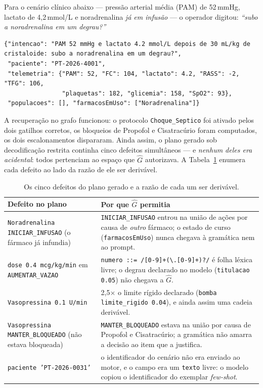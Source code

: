 \documentclass[11pt,a4paper]{article}
\begin{document}
Para o cenário clínico abaixo --- pressão arterial média (PAM) de 52\,mmHg,
lactato de 4{,}2\,mmol/L e noradrenalina \emph{já em infusão} --- o operador
digitou: \emph{``subo a noradrenalina em um degrau?''}

\begin{lstlisting}[language=tsx,caption={Cenário de entrada (\texttt{cenarios-200-med.jsonl}, linha 1).}]
{"intencao": "PAM 52 mmHg e lactato 4.2 mmol/L depois de 30 mL/kg de cristaloide: subo a noradrenalina em um degrau?",
 "paciente": "PT-2026-4001",
 "telemetria": {"PAM": 52, "FC": 104, "lactato": 4.2, "RASS": -2, "TFG": 106,
                "plaquetas": 182, "glicemia": 158, "SpO2": 93},
 "populacoes": [], "farmacosEmUso": ["Noradrenalina"]}
\end{lstlisting}

A recuperação no grafo funcionou: o protocolo \texttt{Choque\_Septico} foi
ativado pelos dois gatilhos corretos, os bloqueios de Propofol e Cisatracúrio
foram computados, os dois escalonamentos dispararam. Ainda assim, o plano gerado
sob decodificação restrita continha cinco defeitos simultâneos --- e
\emph{nenhum deles era acidental}: todos pertenciam ao espaço que
$\hat{G}$ autorizava. A Tabela~\ref{tab:defeitos} enumera cada defeito ao lado
da razão de ele ser derivável.

\begin{table}[h]
\centering
\small
\caption{Os cinco defeitos do plano gerado e a razão de cada um ser derivável.}
\label{tab:defeitos}
\begin{tabular}{@{}p{6.1cm}p{8.4cm}@{}}
\toprule
\textbf{Defeito no plano} & \textbf{Por que $\hat{G}$ permitia} \\
\midrule
\texttt{Noradrenalina INICIAR\_INFUSAO} (o fármaco já infundia) &
\texttt{INICIAR\_INFUSAO} entrou na união de ações por causa de \emph{outro}
fármaco; o estado de curso (\texttt{farmacosEmUso}) nunca chegava à gramática
nem ao prompt. \\
\addlinespace
\texttt{dose 0.4 mcg/kg/min} em \texttt{AUMENTAR\_VAZAO} &
\texttt{numero ::= /[0-9]+(\textbackslash.[0-9]+)?/} é folha léxica livre; o
degrau declarado no modelo (\texttt{titulacao 0.05}) não chegava a $\hat{G}$. \\
\addlinespace
\texttt{Vasopressina 0.1 U/min} &
2{,}5$\times$ o limite rígido declarado (\texttt{bomba limite\_rigido 0.04}),
e ainda assim uma cadeia derivável. \\
\addlinespace
\texttt{Vasopressina MANTER\_BLOQUEADO} (não estava bloqueada) &
\texttt{MANTER\_BLOQUEADO} estava na união por causa de Propofol e Cisatracúrio;
a gramática não amarra a decisão ao item que a justifica. \\
\addlinespace
\texttt{paciente 'PT-2026-0031'} &
o identificador do cenário não era enviado ao motor, e o campo era um
\texttt{texto} livre: o modelo copiou o identificador do exemplar
\emph{few-shot}. \\
\bottomrule
\end{tabular}
\end{table}
\end{document}
